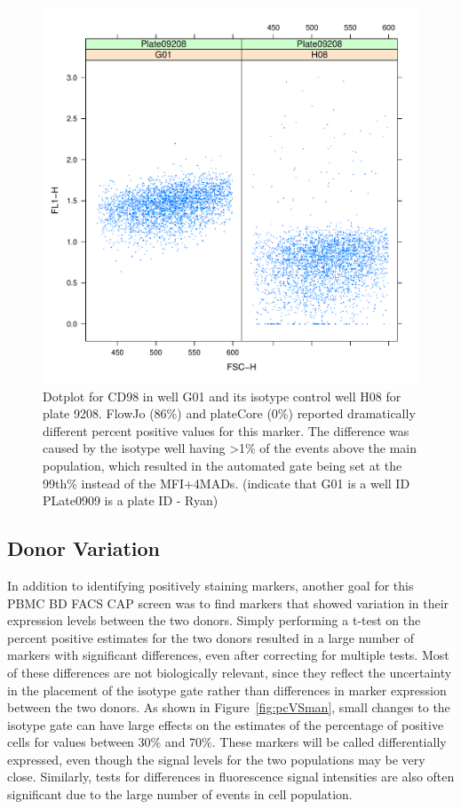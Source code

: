 \documentclass[12pt]{article}
\begin{document}
\begin{figure}
\centering
\includegraphics{fjVSr2.pdf}
\caption{Dotplot for CD98 in well G01 and its isotype control well H08 for
plate 9208. FlowJo (86\%) and plateCore (0\%) reported dramatically different
percent positive values for this marker. The  difference was caused by the
isotype well having >1\% of the events above the main population, which
resulted in the automated gate being set at the 99th\% instead of the
MFI+4MADs. (indicate that G01 is a well ID PLate0909 is a plate ID - Ryan)}
\label{fig:disagree}
\end{figure}


\subsection*{Donor Variation}

In addition to identifying positively staining markers, another goal for this
PBMC BD FACS CAP screen was to find markers that showed variation in their
expression levels between the two donors. Simply performing a t-test
on the percent positive estimates for the two donors resulted in a large number
of markers with significant differences, even after correcting for multiple
tests. Most of these differences are not biologically relevant, since they
reflect the uncertainty in the placement of the isotype gate rather than
differences in marker expression between the two donors. As shown in
Figure~\ref{fig:pcVSman}, small changes to the isotype gate can have large
effects on the estimates of the percentage of positive cells for values between
30\% and 70\%. These markers will be called differentially expressed, even
though the signal levels for the two populations may be very close. Similarly,
tests for differences in fluorescence signal intensities are also often
significant due to the large number of events in cell population.
\end{document}

